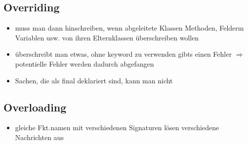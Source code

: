 \subsection{Overriding}
\begin{itemize}
  \item muss man dann hinschreiben, wenn abgeleitete Klassen Methoden, Felderm
  Variablen usw. von ihren Elternklassen überschreiben wollen
  \item überschreibt man etwas, ohne keyword  zu verwenden
  gibts einen Fehler $\Rightarrow$ potentielle Fehler werden dadurch
  abgefangen
  \item Sachen, die als final deklariert sind, kann man nicht 
  
  
  
\end{itemize}


\subsection{Overloading}
\begin{itemize}
  \item gleiche Fkt.namen mit verschiedenen Signaturen lösen verschiedene 
  Nachrichten aus
  
  
  
\end{itemize}


